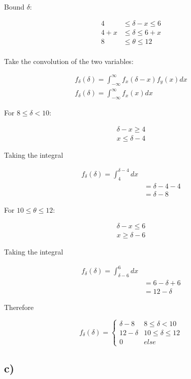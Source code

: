 \documentclass[12pt]{article}
\begin{document}
Bound $\delta$:

\begin{align*}
    4 &\le \delta - x \le 6 \\
    4+x &\le \delta \le 6 + x \\
    8 &\le \theta \le 12 \\
\end{align*}

Take the convolution of the two variables:

\begin{align*}
    f_\delta(\delta) = \int^{\infty}_{-\infty} f_x(\delta - x)f_y(x)dx \\
    f_\delta(\delta) = \int^{\infty}_{-\infty} f_x(x)dx
\end{align*}

For $8 \le \delta < 10$:

\begin{align*}
\delta - x \ge 4 \\
x \le \delta - 4
\end{align*}

Taking the integral

\begin{align*}
    f_\delta(\delta) = \int^{\delta - 4}_{4} dx \\
    &= \delta - 4 - 4 \\
    &= \delta - 8
\end{align*}

For $10 \le \theta \le 12$:

\begin{align*}
\delta - x \le 6 \\
x \ge \delta - 6
\end{align*}

Taking the integral

\begin{align*}
    f_\delta(\delta) = \int^{6}_{\delta - 6} dx \\
    &= 6 - \delta + 6 \\
    &= 12- \delta
\end{align*}

Therefore

\[ f_\delta(\delta) =  \begin{cases} 
      \delta - 8 & 8 \le \delta < 10 \\
      12 - \delta & 10 \le \delta \le 12 \\
      0 & else
   \end{cases}
\]

\subsection*{c)}
\end{document}
